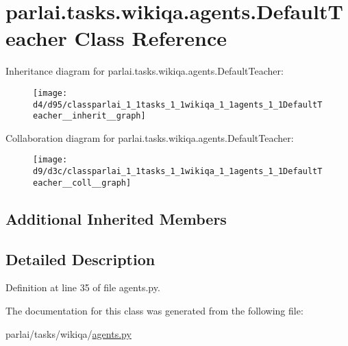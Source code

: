 \hypertarget{classparlai_1_1tasks_1_1wikiqa_1_1agents_1_1DefaultTeacher}{}\section{parlai.\+tasks.\+wikiqa.\+agents.\+Default\+Teacher Class Reference}
\label{classparlai_1_1tasks_1_1wikiqa_1_1agents_1_1DefaultTeacher}


Inheritance diagram for parlai.\+tasks.\+wikiqa.\+agents.\+Default\+Teacher\+:\nopagebreak
\begin{figure}[H]
\begin{center}
\leavevmode
\texttt{[image: d4/d95/classparlai\_1\_1tasks\_1\_1wikiqa\_1\_1agents\_1\_1DefaultTeacher\_\_inherit\_\_graph]}
\end{center}
\end{figure}


Collaboration diagram for parlai.\+tasks.\+wikiqa.\+agents.\+Default\+Teacher\+:\nopagebreak
\begin{figure}[H]
\begin{center}
\leavevmode
\texttt{[image: d9/d3c/classparlai\_1\_1tasks\_1\_1wikiqa\_1\_1agents\_1\_1DefaultTeacher\_\_coll\_\_graph]}
\end{center}
\end{figure}
\subsection*{Additional Inherited Members}


\subsection{Detailed Description}


Definition at line 35 of file agents.\+py.



The documentation for this class was generated from the following file\+:\begin{DoxyCompactItemize}
\item 
parlai/tasks/wikiqa/\hyperlink{parlai_2tasks_2wikiqa_2agents_8py}{agents.\+py}\end{DoxyCompactItemize}
